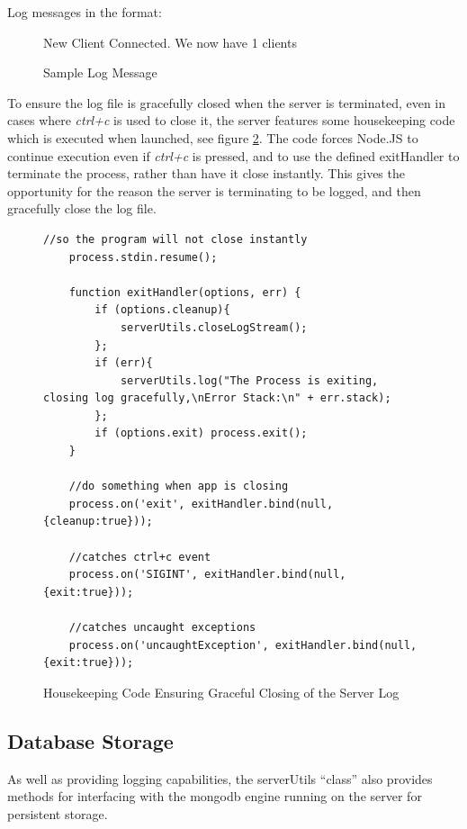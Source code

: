 Log messages in the format:

\begin{figure}[!htbp]
	\centering
	[2014-05-21T15:21:54.443Z][INFO] New Client Connected.  We now have 1 clients
	\caption{Sample Log Message}
	\label{fig:log_message}
\end{figure}

To ensure the log file is gracefully closed when the server is terminated, even in cases where \textit{ctrl+c} is used to close it, the server features some housekeeping code which is executed when launched, see figure \ref{fig:log_close}.  The code forces Node.JS to continue execution even if \textit{ctrl+c} is pressed, and to use the defined exitHandler to terminate the process, rather than have it close instantly.  This gives the opportunity for the reason the server is terminating to be logged, and then gracefully close the log file.

\FloatBarrier

\begin{figure}
	\lstset{language=JavaScript}
	\begin{lstlisting}[tabsize=2,breaklines=true]
	//so the program will not close instantly
	process.stdin.resume();

	function exitHandler(options, err) {
	    if (options.cleanup){
	    	serverUtils.closeLogStream();
	    };
	    if (err){
			serverUtils.log("The Process is exiting, closing log gracefully,\nError Stack:\n" + err.stack);
	    };
	    if (options.exit) process.exit();
	}

	//do something when app is closing
	process.on('exit', exitHandler.bind(null,{cleanup:true}));

	//catches ctrl+c event
	process.on('SIGINT', exitHandler.bind(null, {exit:true}));

	//catches uncaught exceptions
	process.on('uncaughtException', exitHandler.bind(null, {exit:true}));
	\end{lstlisting}
	\caption{Housekeeping Code Ensuring Graceful Closing of the Server Log}
	\label{fig:log_close}
\end{figure}

\FloatBarrier

\subsection{Database Storage}
\label{subs:exics_mongodb}

\FloatBarrier

As well as providing logging capabilities, the serverUtils ``class'' also provides methods for interfacing with the mongodb engine running on the server for persistent storage.

